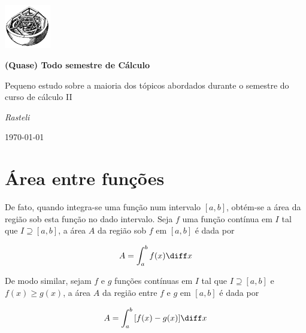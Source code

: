 \documentclass[a4paper, 12pt]{extreport}
\title{\doctitle}
\author{\docauthor}
\def\doctitle{(Quase) Todo semestre de Cálculo}
\def\docauthor{Rasteli}
\begin{document}

  \begin{titlepage}
	  \centering
    \includegraphics[width=0.15\textwidth]{geoart}\par\vspace{1cm}
	  \vspace{1.5cm}
	  {\huge\bfseries \doctitle\par}
	  \vspace{1cm}
    {\Large {Pequeno estudo sobre a maioria dos tópicos abordados durante o semestre do curso de cálculo II}\par}
	  \vspace{1cm}
	  {\Large\itshape \docauthor\par}

	  \vfill

	  {\large \today\par}
  \end{titlepage}
  \tableofcontents

  \newpage

  \chapter{\texorpdfstring{Área entre funções}{TEXT}{}}
    De fato, quando integra-se uma função num intervalo $ [a, b] $, obtém-se a área da região sob esta função no dado intervalo.
    Seja $ f $ uma função contínua em $ I $ tal que $ I \supseteq [a, b] $, a área $ A $ da região sob $ f $ em $ [a, b] $ é dada por

    \begin{equation}
      A = \int_a^b{f(x)}\diff x
    \end{equation}

    De modo similar, sejam $ f $ e $ g $ funções contínuas em $ I $ tal que $ I \supseteq [a, b] $ e $ f(x) \geqslant g(x) $, a área $ A $ da região entre
    $ f $ e $ g $ em $ [a, b] $ é dada por

    \begin{equation}
      A = \int_a^b{[f(x) - g(x)]}\diff x
    \end{equation}
\end{document}
